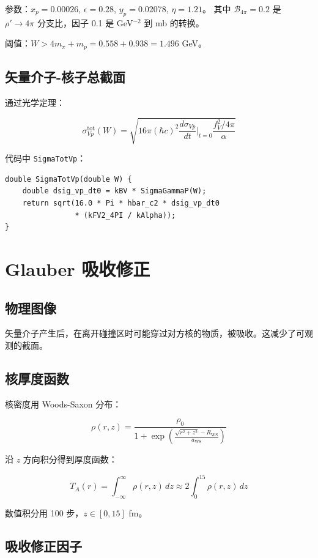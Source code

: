 \documentclass[11pt,a4paper,UTF8]{ctexart}
\begin{document}
参数：$x_p = 0.00026$, $\epsilon = 0.28$, $y_p = 0.02078$, $\eta = 1.21$。
其中 $\mathcal{B}_{4\pi} = 0.2$ 是 $\rho' \to 4\pi$ 分支比，因子 0.1 是 GeV$^{-2}$ 到 mb 的转换。

阈值：$W > 4m_\pi + m_p = 0.558 + 0.938 = 1.496$ GeV。

\subsection{矢量介子-核子总截面}

通过光学定理：

\[
\sigma_{Vp}^{\text{tot}}(W) = \sqrt{16\pi (\hbar c)^2 \frac{d\sigma_{Vp}}{dt}\bigg|_{t=0} \frac{f_V^2/4\pi}{\alpha}}
\]

代码中 \texttt{SigmaTotVp}：

\begin{verbatim}
double SigmaTotVp(double W) {
    double dsig_vp_dt0 = kBV * SigmaGammaP(W);
    return sqrt(16.0 * Pi * hbar_c2 * dsig_vp_dt0 
                * (kFV2_4PI / kAlpha));
}
\end{verbatim}

\section{Glauber 吸收修正}

\subsection{物理图像}

矢量介子产生后，在离开碰撞区时可能穿过对方核的物质，被吸收。这减少了可观测的截面。

\subsection{核厚度函数}

核密度用 Woods-Saxon 分布：

\[
\rho(r,z) = \frac{\rho_0}{1 + \exp\left(\frac{\sqrt{r^2+z^2} - R_{\text{WS}}}{a_{\text{WS}}}\right)}
\]

沿 $z$ 方向积分得到厚度函数：

\[
T_A(r) = \int_{-\infty}^{\infty} \rho(r,z)\,dz \approx 2\int_0^{15} \rho(r,z)\,dz
\]

数值积分用 100 步，$z \in [0, 15]$ fm。

\subsection{吸收修正因子}
\end{document}
